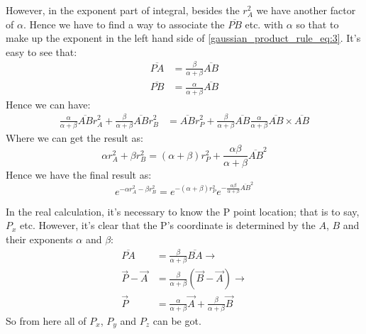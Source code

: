 However, in the exponent part of integral, besides the $r_{A}^{2}$ we have another factor 
of $\alpha$. Hence we have to find a way to associate the $\overline{PB}$ etc. with 
$\alpha$ so that to make up the exponent in the left hand side of \ref{gaussian_product_rule_eq:3}. 
It's easy to see that:
\begin{align}
 \label{gaussian_product_rule_eq:4}
\overline{PA} &= \frac{\beta}{\alpha+\beta}\overline{AB} \nonumber \\
\overline{PB} &= \frac{\alpha}{\alpha+\beta}\overline{AB}
\end{align}
Hence we can have:
\begin{equation}
\label{gaussian_product_rule_eq:5}
 \begin{split}
\frac{\alpha}{\alpha+\beta}\overline{AB}r_{A}^{2} +  
\frac{\beta}{\alpha+\beta}\overline{AB}r_{B}^{2} &= \overline{AB}r_{P}^{2} + 
\frac{\beta}{\alpha+\beta}\overline{AB}\frac{\alpha}{\alpha+\beta}\overline{AB}\times\overline{AB} 
 \end{split}
\end{equation}
Where we can get the result as:
\begin{equation}
\label{gaussian_product_rule_eq:6}
\alpha r_{A}^{2} + \beta r_{B}^{2} = (\alpha+\beta)r_{P}^{2} + \frac{\alpha\beta}{\alpha+\beta}
\overline{AB}^{2}
\end{equation}
Hence we have the final result as:
\begin{equation}
\label{gaussian_product_rule_eq:7}
e^{-\alpha r_{A}^{2} - \beta r_{B}^{2}} = 
e^{-(\alpha+\beta)r_{P}^{2}} e^{-\frac{\alpha\beta}{\alpha+\beta}
\overline{AB}^{2}}
\end{equation}

In the real calculation, it's necessary to know the P point location; that is to say, $P_{x}$ etc.
However, it's clear that the P's coordinate is determined by the $A$, $B$ and their exponents $\alpha$
and $\beta$:
\begin{equation}
 \label{gaussian_product_rule_eq:8}
\begin{split}
 \overline{PA} &= \frac{\beta}{\alpha+\beta}\overline{BA} \rightarrow \\
\overrightarrow{P} - \overrightarrow{A} &= \frac{\beta}{\alpha+\beta}
(\overrightarrow{B} - \overrightarrow{A}) \rightarrow  \\
\overrightarrow{P} &= \frac{\alpha}{\alpha+\beta}\overrightarrow{A} + 
\frac{\beta}{\alpha+\beta}\overrightarrow{B}
\end{split}
\end{equation}
So from here all of $P_{x}$, $P_{y}$ and $P_{z}$ can be got.

